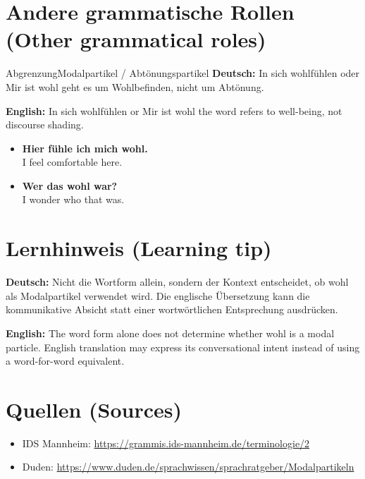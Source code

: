 \documentclass[a4paper,11pt]{article}
\newcommand{\GermanText}[1]{\textbf{Deutsch: }#1\par}
\newcommand{\EnglishText}[1]{{\small\color{SoftGray}\textbf{English: }#1\par}}
\newcommand{\ExampleItem}[2]{\item \textbf{#1}\\{\small\color{SoftGray}#2}}
\begin{document}
\section{Andere grammatische Rollen \textnormal{(Other grammatical roles)}}
\begin{grammarentry}{Abgrenzung}{Modalpartikel / Abtönungspartikel}
\GermanText{In sich wohlfühlen oder Mir ist wohl geht es um Wohlbefinden, nicht um Abtönung.}
\EnglishText{In sich wohlfühlen or Mir ist wohl the word refers to well-being, not discourse shading.}
\end{grammarentry}
\begin{exbox}\begin{itemize}
\ExampleItem{Hier fühle ich mich wohl.}{I feel comfortable here.}
\ExampleItem{Wer das wohl war?}{I wonder who that was.}
\end{itemize}\end{exbox}
\section{Lernhinweis \textnormal{(Learning tip)}}
\GermanText{Nicht die Wortform allein, sondern der Kontext entscheidet, ob wohl als Modalpartikel verwendet wird. Die englische Übersetzung kann die kommunikative Absicht statt einer wortwörtlichen Entsprechung ausdrücken.}
\EnglishText{The word form alone does not determine whether wohl is a modal particle. English translation may express its conversational intent instead of using a word-for-word equivalent.}
\section{Quellen \textnormal{(Sources)}}
\begin{itemize}
\item IDS Mannheim: \url{https://grammis.ids-mannheim.de/terminologie/2}
\item Duden: \url{https://www.duden.de/sprachwissen/sprachratgeber/Modalpartikeln}
\end{itemize}
\end{document}
